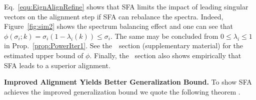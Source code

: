 \vspace{-0.3cm}
\begin{tcolorbox}[width=1.0\linewidth, colframe=blackish, colback=beaublue, boxsep=0mm, arc=2mm, left=2mm, right=2mm, top=2mm, bottom=2mm]
Eq.~\eqref{equ:EignAlignRefine} shows that SFA limits the impact of leading singular vectors on the alignment step if SFA can rebalance the spectra. Indeed, Figure~\ref{fig:sim2} shows the spectrum balancing effect and one can see that $\phi(\sigma_i;k)=\sigma_i(1-\lambda_i(k))\leq\sigma_i$. The same may be concluded from $0\leq\lambda_i\leq1$ in Prop.~\ref{prop:PowerIter1}. See the~~section (supplementary material) for the estimated upper bound of $\phi$. Finally, the ~section also shows empirically that SFA leads to a superior alignment.
\end{tcolorbox}

\vspace{0.3cm}
\noindent\textbf{Improved Alignment Yields Better Generalization Bound.$\!\!\!$} 
To show SFA achieves the improved generalization bound we quote the following theorem \citep{DBLP:journals/corr/abs-2111-00743}. 




